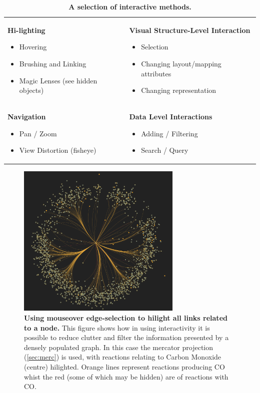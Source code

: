 \begin{table}[h]
    \centering
    \begin{tabular}{p{}p{}}
\textbf{Hi-lighting}
\begin{itemize}
\item Hovering
\item Brushing and Linking
\item Magic Lenses (see hidden objects)
\end{itemize}
&
\textbf{Visual Structure-Level Interaction}
\begin{itemize}
\item Selection
\item Changing layout/mapping attributes
\item Changing representation
\end{itemize}
\\
\textbf{Navigation}
\begin{itemize}
\item Pan / Zoom
\item View Distortion (fisheye)
\end{itemize}
&
\textbf{Data Level Interactions}
\begin{itemize}
\item Adding / Filtering
\item Search / Query
\end{itemize}

\end{tabular}
    \caption{\textbf{A selection of interactive methods.}}
    \label{tab:interactive}
\end{table}

\begin{figure}[H]
     \centering
     \includegraphics[width=0.7\textwidth]{figures_c1/layout/CObranches.png}
        \caption{\textbf{Using mouseover edge-selection to hilight all links related to a node. } This figure shows how in using interactivity it is possible to reduce clutter and filter the information presented by a densely populated graph. In this case the mercator projection (\autoref{sec:merc}) is used, with reactions relating to Carbon Monoxide (centre) hilighted. Orange lines represent reactions producing CO whist the red (some of which may be hidden) are of reactions with CO.  }
      \label{fig:tooltip}
\end{figure}


